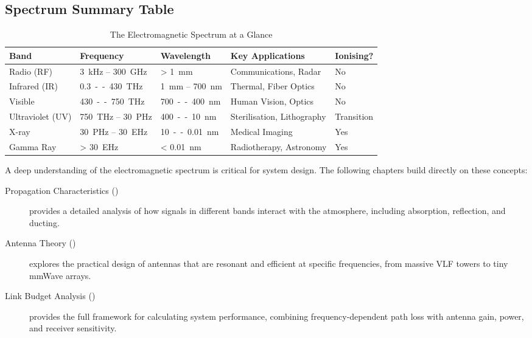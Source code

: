 \subsection{Spectrum Summary Table}

\begin{table}[H]
    \centering
    \caption{The Electromagnetic Spectrum at a Glance}
    \label{tab:spectrum-summary}
    \begin{tabularx}{\textwidth}{@{}l l l X l@{}}
        \toprule
        \tableheaderfont Band & \tableheaderfont Frequency & \tableheaderfont Wavelength & \tableheaderfont Key Applications & \tableheaderfont Ionising? \\
        \midrule
        Radio (RF) & \qty{3}{kHz} -- \qty{300}{GHz} & > \qty{1}{mm} & Communications, Radar & No \\
        Infrared (IR) & \qty{0.3} -- \qty{430}{THz} & \qty{1}{mm} -- \qty{700}{nm} & Thermal, Fiber Optics & No \\
        Visible & \qty{430} -- \qty{750}{THz} & \qty{700} -- \qty{400}{nm} & Human Vision, Optics & No \\
        Ultraviolet (UV) & \qty{750}{THz} -- \qty{30}{PHz} & \qty{400} -- \qty{10}{nm} & Sterilisation, Lithography & Transition \\
        X-ray & \qty{30}{PHz} -- \qty{30}{EHz} & \qty{10} -- \qty{0.01}{nm} & Medical Imaging & Yes \\
        Gamma Ray & > \qty{30}{EHz} & < \qty{0.01}{nm} & Radiotherapy, Astronomy & Yes \\
        \bottomrule
    \end{tabularx}
\end{table}

\begin{importantbox}
    A deep understanding of the electromagnetic spectrum is critical for system design. The following chapters build directly on these concepts:
    \begin{description}
        \item[Propagation Characteristics ()] provides a detailed analysis of how signals in different bands interact with the atmosphere, including absorption, reflection, and ducting.
        \item[Antenna Theory ()] explores the practical design of antennas that are resonant and efficient at specific frequencies, from massive VLF towers to tiny mmWave arrays.
        \item[Link Budget Analysis ()] provides the full framework for calculating system performance, combining frequency-dependent path loss with antenna gain, power, and receiver sensitivity.
    \end{description}
\end{importantbox}